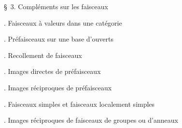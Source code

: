 \noindent\quad \S\ 3. Compléments sur les faisceaux\dotfill

\noindent{}. Faisceaux à valeurs dans une catégorie\dotfill

\noindent{}. Préfaisceaux sur une base d'ouverts\dotfill

\noindent{}. Recollement de faisceaux\dotfill

\noindent{}. Images directes de préfaisceaux\dotfill

\noindent{}. Images réciproques de préfaisceaux\dotfill

\noindent{}. Faisceaux simples et faisceaux localement simples\dotfill

\noindent{}. Images réciproques de faisceaux de groupes ou d'anneaux\dotfill

